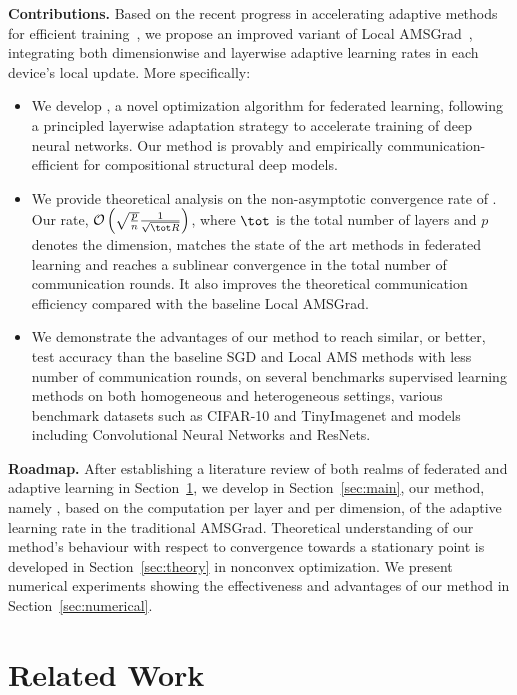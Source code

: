 \documentclass[twoside]{article}
\begin{document}
\noindent\textbf{Contributions.} Based on the recent progress in accelerating adaptive methods for efficient training~\citet{you2019large}, we propose an improved variant of Local AMSGrad~\cite{chen2020toward}, integrating both dimensionwise and layerwise adaptive learning rates in each device's local update.
More specifically:
\begin{itemize}
\item We develop  \algo, a novel optimization algorithm for federated learning, following a principled layerwise adaptation strategy to accelerate training of deep neural networks. Our method is provably and empirically communication-efficient for compositional structural deep models.

\item We provide theoretical analysis on the non-asymptotic convergence rate of \algo. Our rate, $\mathcal{O}\left(\sqrt{\frac{ p}{ n}} \frac{1}{\sqrt{\tot R} } \right)$, where $\tot$ is the total number of layers and $p$ denotes the dimension, matches the state of the art methods in federated learning and reaches a sublinear convergence in the total number of communication rounds. It also improves the theoretical communication efficiency compared with the baseline Local AMSGrad.

\item We demonstrate the advantages of our method to reach similar, or better, test accuracy than the baseline SGD and Local AMS methods with less number of communication rounds, on several benchmarks supervised learning methods on both homogeneous and heterogeneous settings, various benchmark datasets such as CIFAR-10 and TinyImagenet and models including Convolutional Neural Networks and ResNets.
\end{itemize}

\vspace{0.1in}
\noindent\textbf{Roadmap.} After establishing a literature review of both realms of federated and adaptive learning in Section~\ref{sec:related}, we develop in Section~\ref{sec:main}, our method, namely \algo, based on the computation per layer and per dimension, of the adaptive learning rate in the traditional AMSGrad.
Theoretical understanding of our method's behaviour with respect to convergence towards a stationary point is developed in Section~\ref{sec:theory} in nonconvex optimization.
We present numerical experiments showing the effectiveness and advantages of our method in Section~\ref{sec:numerical}.

\section{Related Work}\label{sec:related}
\end{document}
